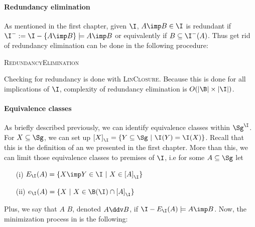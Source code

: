 \paragraph{Redundancy elimination} As mentioned in the first chapter, given 
$\I$, $A \imp B \in \I$ is redundant if $\I^{-} := \I - \{ A \imp B \} \models A \imp B$ or equivalently if $B \subseteq \I^{-}(A)$. Thus get rid of 
redundancy elimination can be done in the following procedure:

\begin{algorithm}
	
	\BlankLine
	\BlankLine
	
	
	\caption{\textsc{RedundancyElimination}}
	\label{alg:Maier-RE}	
\end{algorithm}

\noindent Checking for redundancy is done with \textsc{LinClosure}. Because this
is done for all implications of $\I$, complexity of redundancy elimination is
$O(|\B| \times |\I|)$.

\vspace{1.2em}

\paragraph{Equivalence classes} As briefly described previously, we can identify
equivalence classes within $\Sg^{\I}$. For $X \subseteq \Sg$, we can set up
$\left[ X \right]_{\I} = \{ Y \subseteq \Sg \ | \ \I(Y) = \I(X) \}$. Recall 
that this is the definition of an  we presented in the first chapter. More than this, we can limit those equivalence classes to premises of $\I$, i.e for some $A \subseteq \Sg$ let
\begin{itemize}
	\item[(i)] $E_{\I}(A) = \{ X \imp Y \in \I \ | \ X \in \left[ A 
	\right]_{\I} \}$ 
	\item[(ii)] $e_{\I}(A) =\{ X \ | \ X \in \B(\I) \cap \left[ A \right]_{\I} 
	\}$
\end{itemize}
\noindent Plus, we say that $A$  $B$, denoted $A 
\ddv B$, if $\I - E_{\I}(A) \models A \imp B$. Now, the minimization process
in \cite{maier_theory_1983, maier_minimum_1980} is the following: 

